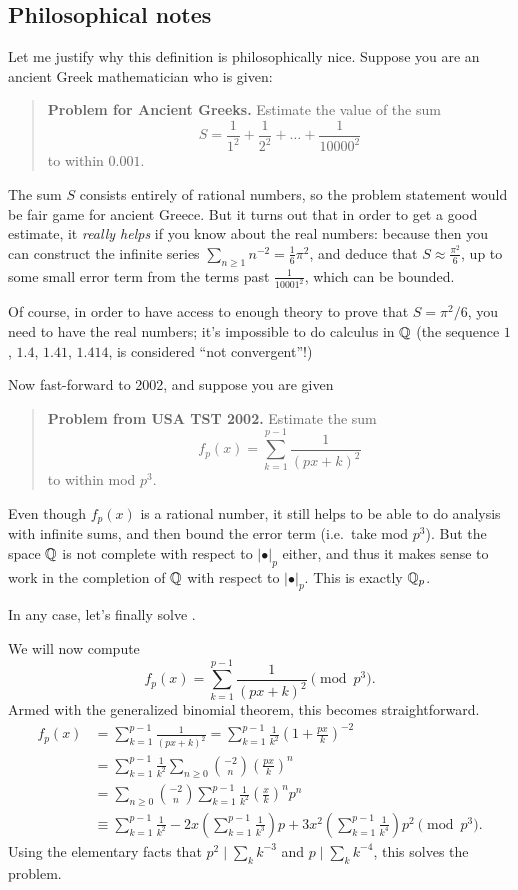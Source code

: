 \subsection{Philosophical notes}
Let me justify why this definition is philosophically nice.
Suppose you are an ancient Greek mathematician who is given:
\begin{quote}
	\textbf{Problem for Ancient Greeks.}
	Estimate the value of the sum
	\[ S = \frac{1}{1^2} + \frac{1}{2^2} + \dots + \frac{1}{10000^2} \]
	to within $0.001$.
\end{quote}
The sum $S$ consists entirely of rational numbers,
so the problem statement would be fair game for ancient Greece.
But it turns out that in order to get a good estimate,
it \emph{really helps} if you know about the real numbers:
because then you can construct the infinite series
$\sum_{n \ge 1} n^{-2} = \frac16 \pi^2$,
and deduce that $S \approx \frac{\pi^2}{6}$,
up to some small error term from the terms past $\frac{1}{10001^2}$,
which can be bounded.

Of course, in order to have access to enough theory
to prove that $S = \pi^2/6$, you need to have the real numbers;
it's impossible to do calculus in $\mathbb Q$
(the sequence $1$, $1.4$, $1.41$, $1.414$,
is considered ``not convergent''!)

Now fast-forward to 2002, and suppose you are given
\begin{quote}
	\textbf{Problem from USA TST 2002.}
	Estimate the sum
	\[ f_p(x) = \sum_{k=1}^{p-1} \frac{1}{(px+k)^2} \]
	to within mod $p^3$.
\end{quote}
Even though $f_p(x)$ is a rational number,
it still helps to be able to do analysis with infinite sums,
and then bound the error term (i.e.\ take mod $p^3$).
But the space $\mathbb Q$ is not complete with respect
to $\left\lvert \bullet \right\rvert_p$ either,
and thus it makes sense to work in the completion of $\mathbb Q$
with respect to $\left\lvert \bullet \right\rvert_p$.
This is exactly $\mathbb Q_p$.

In any case, let's finally solve .
\begin{example}
We will now compute
\[ f_p(x) = \sum_{k=1}^{p-1} \frac{1}{(px+k)^2} \pmod{p^3}. \]
Armed with the generalized binomial theorem,
this becomes straightforward.
\begin{align*}
	f_p(x) &= \sum_{k=1}^{p-1} \frac{1}{(px+k)^2}
	= \sum_{k=1}^{p-1} \frac{1}{k^2}
	\left( 1 + \frac{px}{k} \right)^{-2} \\
	&= \sum_{k=1}^{p-1} \frac{1}{k^2} \sum_{n \ge 0}
	\binom{-2}{n} \left( \frac{px}{k} \right)^{n} \\
	&= \sum_{n \ge 0} \binom{-2}{n}
	\sum_{k=1}^{p-1} \frac{1}{k^2} \left( \frac{x}{k} \right)^{n} p^n \\
	&\equiv \sum_{k=1}^{p-1} \frac{1}{k^2}
	 - 2x \left( \sum_{k=1}^{p-1} \frac{1}{k^3} \right) p
	 + 3x^2 \left( \sum_{k=1}^{p-1} \frac{1}{k^4} \right) p^2 \pmod{p^3}.
\end{align*}
Using the elementary facts that
$p^2 \mid \sum_k k^{-3}$ and $p \mid \sum_k k^{-4}$,
this solves the problem.
\end{example}


